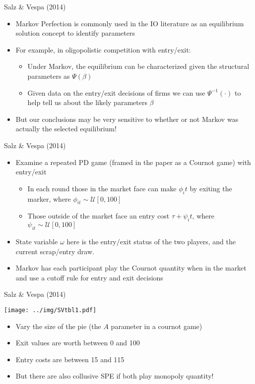 \documentclass{beamer}
\begin{document}
\begin{frame}{Salz \& Vespa (2014) }
	\begin{itemize}
		\item Markov Perfection is commonly used in the IO literature as an equilibrium solution concept to identify parameters\pause
		\item For example, in oligopolistic competition with entry/exit:
		\begin{itemize}
			\item Under Markov, the equilibrium can be characterized given the structural parameters as $\Psi(\beta)$
			\item Given data on the entry/exit decisions of firms we can use $\Psi^{-1}(\cdot)$ to help tell us about the likely parameters $\beta$
		\end{itemize}\pause
		\item But our conclusions may be very sensitive to whether or not Markov was actually the selected equilibrium!
	\end{itemize}
\end{frame}

\begin{frame}{Salz \& Vespa (2014) }
	\begin{itemize}
		\item Examine a repeated PD game (framed in the paper as a Cournot game) with entry/exit \pause
		\begin{itemize}
			\item In each round those in the market face can make $\phi_it$ by exiting the marker, where $\phi_{it}\sim\mathcal{U}[0,100]$
			\item Those outside of the market face an entry cost $\tau+\psi_it$, where $\psi_{it}\sim\mathcal{U}[0,100]$
		\end{itemize}\pause
		\item State variable $\omega$ here is the entry/exit status of the two players, and the current scrap/entry draw.
		\item Markov has each participant play the Cournot quantity when in the market and use a cutoff rule for entry and exit decisions
	\end{itemize}
\end{frame}


\begin{frame}{Salz \& Vespa (2014) }
\begin{center}
	\texttt{[image: ../img/SVtbl1.pdf]}
\end{center}
	\begin{itemize}
		\item Vary the size of the pie (the $A$ parameter in a cournot game)
		\item Exit values are worth between 0 and 100
		\item Entry costs are between 15 and 115\pause
		\item But there are also collusive SPE if both play monopoly quantity!
	\end{itemize}
\end{frame}
\end{document}
